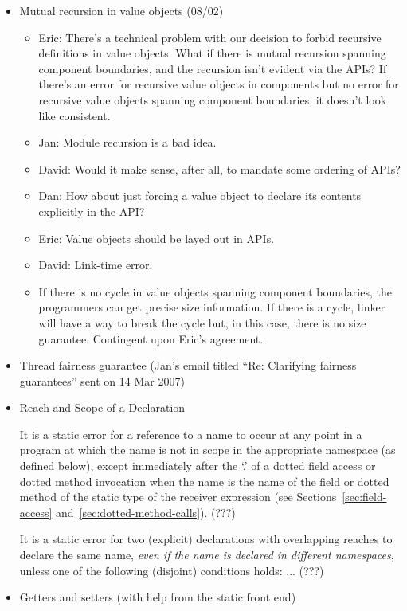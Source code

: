\begin{itemize}
\item Mutual recursion in value objects (08/02)
 \begin{itemize}
\item Eric: There's a technical problem with our decision to forbid recursive definitions in value objects. What if there is mutual recursion spanning component boundaries, and the recursion isn't evident via the APIs? If there's an error for recursive value objects in components but no error for recursive value objects spanning component boundaries, it doesn't look like consistent.
\item Jan: Module recursion is a bad idea.
\item David: Would it make sense, after all, to mandate some ordering of APIs?
\item Dan: How about just forcing a value object to declare its contents explicitly in the API?
\item Eric: Value objects should be layed out in APIs.
\item David: Link-time error.
\item If there is no cycle in value objects spanning component boundaries, the programmers can get precise size information. If there is a cycle, linker will have a way to break the cycle but, in this case, there is no size guarantee.
Contingent upon Eric's agreement.
 \end{itemize}

\item Thread fairness guarantee (Jan's email titled ``Re: Clarifying fairness guarantees'' sent on 14 Mar 2007)

\item {} Reach and Scope of a Declaration

It is a static error for a reference to a name
to occur at any point in a program
at which the name is not in scope in the appropriate namespace
(as defined below),
except immediately after the `.'
of a dotted field access or dotted method invocation
when the name is the name of the field or dotted method
of the static type of the receiver expression
(see Sections~\ref{sec:field-access}
and~\ref{sec:dotted-method-calls}). (???)

It is a static error
for two (explicit) declarations with overlapping reaches
to declare the same name,
\emph{even if the name is declared in different namespaces},
unless one of the following (disjoint) conditions holds:
... (???)

\item Getters and setters (with help from the static front end)


\end{itemize}
